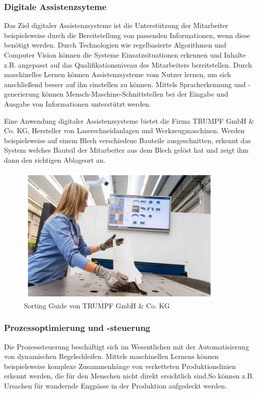 \documentclass[a4paper,12pt, german]{report}
\begin{document}
\subsubsection{Digitale Assistenzsyteme}
Das Ziel digitaler Assistenzsysteme ist die Unterstützung der Mitarbeiter beispielsweise durch die Bereitstellung von passenden Informationen, wenn diese benötigt werden. Durch Technologien wie regelbasierte Algorithmen und Computer Vision können die Systeme Einsatzsituationen erkennen und Inhalte z.B. angepasst auf das Qualifikationsniveau des Mitarbeiters bereitstellen. Durch maschinelles Lernen können Assistenzsysteme vom Nutzer lernen, um sich anschließend besser auf ihn einstellen zu können. Mittels Spracherkennung und -generierung können Mensch-Maschine-Schnittstellen bei der Eingabe und Ausgabe von Informationen unterstützt werden.\cite{24}

Eine Anwendung digitaler Assistenzsysteme bietet die Firma TRUMPF GmbH \& Co. KG, Hersteller von Laserschneidanlagen und Werkzeugmaschinen. Werden beispielsweise auf einem Blech verschiedene Bauteile ausgeschnitten, erkennt das System welches Bauteil der Mitarbeiter aus dem Blech gelöst hat und zeigt ihm dann den richtigen Ablageort an.\cite{25}

\begin{figure}
  \center
 \includegraphics[width=10cm]{images/trumpf.png}
  \caption[Sorting Guide von TRUMPF GmbH \& Co. KG]{Sorting Guide von TRUMPF GmbH \& Co. KG \cite{25}}
\end{figure}

\subsubsection{Prozessoptimierung und -steuerung}
Die Prozesssteuerung beschäftigt sich im Wesentlichen mit der Automatisierung von dynamischen Regelschleifen. Mittels maschinellen Lernens können beispielsweise komplexe Zusammenhänge von verketteten Produktionslinien erkennt werden, die für den Menschen nicht direkt ersichtlich sind.So können z.B. Ursachen für wandernde Engpässe in der Produktion aufgedeckt werden.
\end{document}
